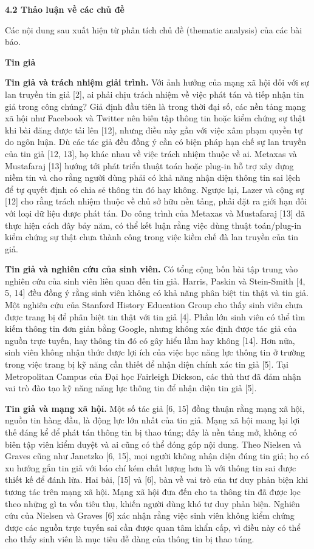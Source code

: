 \textbf{4.2 Thảo luận về các chủ đề}

Các nội dung sau xuất hiện từ phân tích chủ đề (thematic analysis) của các bài báo.

\textbf{Tin giả}

\textbf{Tin giả và trách nhiệm giải trình.} Với ảnh hưởng của mạng xã hội đối với sự lan truyền tin giả {[}2{]}, ai phải chịu trách nhiệm về việc phát tán và tiếp nhận tin giả trong công chúng? Giả định đầu tiên là trong thời đại số, các nền tảng mạng xã hội như Facebook và Twitter nên biên tập thông tin hoặc kiểm chứng sự thật khi bài đăng được tải lên {[}12{]}, nhưng điều này gần với việc xâm phạm quyền tự do ngôn luận. Dù các tác giả đều đồng ý cần có biện pháp hạn chế sự lan truyền của tin giả {[}12, 13{]}, họ khác nhau về việc trách nhiệm thuộc về ai. Metaxas và Mustafaraj {[}13{]} hướng tới phát triển thuật toán hoặc plug-in hỗ trợ xây dựng niềm tin và cho rằng người dùng phải có khả năng nhận diện thông tin sai lệch để tự quyết định có chia sẻ thông tin đó hay không. Ngược lại, Lazer và cộng sự {[}12{]} cho rằng trách nhiệm thuộc về chủ sở hữu nền tảng, phải đặt ra giới hạn đối với loại dữ liệu được phát tán. Do công trình của Metaxas và Mustafaraj {[}13{]} đã thực hiện cách đây bảy năm, có thể kết luận rằng việc dùng thuật toán/plug-in kiểm chứng sự thật chưa thành công trong việc kiềm chế đà lan truyền của tin giả.

\textbf{Tin giả và nghiên cứu của sinh viên.} Có tổng cộng bốn bài tập trung vào nghiên cứu của sinh viên liên quan đến tin giả. Harris, Paskin và Stein-Smith {[}4, 5, 14{]} đều đồng ý rằng sinh viên không có khả năng phân biệt tin thật và tin giả. Một nghiên cứu của Stanford History Education Group cho thấy sinh viên chưa được trang bị để phân biệt tin thật với tin giả {[}4{]}. Phần lớn sinh viên có thể tìm kiếm thông tin đơn giản bằng Google, nhưng không xác định được tác giả của nguồn trực tuyến, hay thông tin đó có gây hiểu lầm hay không {[}14{]}. Hơn nữa, sinh viên không nhận thức được lợi ích của việc học năng lực thông tin ở trường trong việc trang bị kỹ năng cần thiết để nhận diện chính xác tin giả {[}5{]}. Tại Metropolitan Campus của Đại học Fairleigh Dickson, các thủ thư đã đảm nhận vai trò đào tạo kỹ năng năng lực thông tin để nhận diện tin giả {[}5{]}.

\textbf{Tin giả và mạng xã hội.} Một số tác giả {[}6, 15{]} đồng thuận rằng mạng xã hội, nguồn tin hàng đầu, là động lực lớn nhất của tin giả. Mạng xã hội mang lại lợi thế đáng kể để phát tán thông tin bị thao túng; đây là nền tảng mở, không có biên tập viên kiểm duyệt và ai cũng có thể đóng góp nội dung. Theo Nielsen và Graves cũng như Janetzko {[}6, 15{]}, mọi người không nhận diện đúng tin giả; họ có xu hướng gắn tin giả với báo chí kém chất lượng hơn là với thông tin sai được thiết kế để đánh lừa. Hai bài, {[}15{]} và {[}6{]}, bàn về vai trò của tư duy phản biện khi tương tác trên mạng xã hội. Mạng xã hội đưa đến cho ta thông tin đã được lọc theo những gì ta vốn tiêu thụ, khiến người dùng khó tư duy phản biện. Nghiên cứu của Nielsen và Graves {[}6{]} xác nhận rằng việc sinh viên không kiểm chứng được các nguồn trực tuyến sai cần được quan tâm khẩn cấp, vì điều này có thể cho thấy sinh viên là mục tiêu dễ dàng của thông tin bị thao túng.

